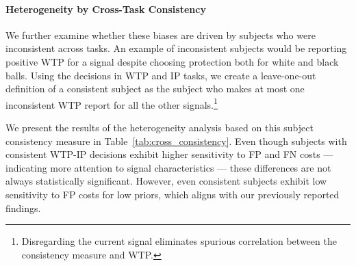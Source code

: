 \documentclass[12pt,a4paper]{article}
\begin{document}
{\color{OliveGreen}

\paragraph{Heterogeneity by Cross-Task Consistency} We further examine whether these biases are driven by subjects who were inconsistent across tasks. An example of inconsistent subjects would be reporting positive WTP for a signal despite choosing protection both for white and black balls. Using the decisions in WTP and IP tasks, we create a leave-one-out definition of a consistent subject as the subject who makes at most one inconsistent WTP report for all the other signals.\footnote{Disregarding the current signal eliminates spurious correlation between the consistency measure and WTP.}

We present the results of the heterogeneity analysis based on this subject consistency measure in Table~\ref{tab:cross_consistency}. Even though subjects with consistent WTP-IP decisions exhibit higher sensitivity to FP and FN costs --- indicating more attention to signal characteristics --- these differences are not always statistically significant. However, even consistent subjects exhibit low sensitivity to FP costs for low priors, which aligns with our previously reported findings.

    \begin{table}[htbp!]
    \centering
    \end{table}

}
\bigskip
\end{document}
